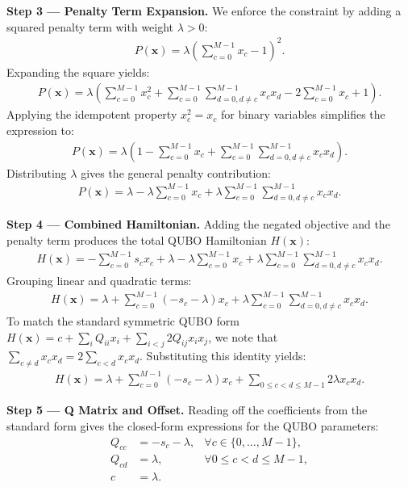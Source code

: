 \documentclass[12pt]{article}
\begin{document}
\textbf{Step 3 --- Penalty Term Expansion.} We enforce the constraint by adding a squared penalty term with weight $\lambda > 0$:
\begin{align}
P(\mathbf{x}) = \lambda \left( \sum_{c=0}^{M-1} x_c - 1 \right)^2.
\end{align}
Expanding the square yields:
\begin{align}
P(\mathbf{x}) = \lambda \left( \sum_{c=0}^{M-1} x_c^2 + \sum_{c=0}^{M-1} \sum_{d=0, d \neq c}^{M-1} x_c x_d - 2 \sum_{c=0}^{M-1} x_c + 1 \right).
\end{align}
Applying the idempotent property $x_c^2 = x_c$ for binary variables simplifies the expression to:
\begin{align}
P(\mathbf{x}) = \lambda \left( 1 - \sum_{c=0}^{M-1} x_c + \sum_{c=0}^{M-1} \sum_{d=0, d \neq c}^{M-1} x_c x_d \right).
\end{align}
Distributing $\lambda$ gives the general penalty contribution:
\begin{align}
P(\mathbf{x}) = \lambda - \lambda \sum_{c=0}^{M-1} x_c + \lambda \sum_{c=0}^{M-1} \sum_{d=0, d \neq c}^{M-1} x_c x_d.
\end{align}

\textbf{Step 4 --- Combined Hamiltonian.} Adding the negated objective and the penalty term produces the total QUBO Hamiltonian $H(\mathbf{x})$:
\begin{align}
H(\mathbf{x}) = -\sum_{c=0}^{M-1} s_c x_c + \lambda - \lambda \sum_{c=0}^{M-1} x_c + \lambda \sum_{c=0}^{M-1} \sum_{d=0, d \neq c}^{M-1} x_c x_d.
\end{align}
Grouping linear and quadratic terms:
\begin{align}
H(\mathbf{x}) = \lambda + \sum_{c=0}^{M-1} (-s_c - \lambda) x_c + \lambda \sum_{c=0}^{M-1} \sum_{d=0, d \neq c}^{M-1} x_c x_d.
\end{align}
To match the standard symmetric QUBO form $H(\mathbf{x}) = c + \sum_{i} Q_{ii} x_i + \sum_{i < j} 2 Q_{ij} x_i x_j$, we note that $\sum_{c \neq d} x_c x_d = 2 \sum_{c < d} x_c x_d$. Substituting this identity yields:
\begin{align}
H(\mathbf{x}) = \lambda + \sum_{c=0}^{M-1} (-s_c - \lambda) x_c + \sum_{0 \leq c < d \leq M-1} 2\lambda x_c x_d.
\end{align}

\textbf{Step 5 --- Q Matrix and Offset.} Reading off the coefficients from the standard form gives the closed-form expressions for the QUBO parameters:
\begin{align}
Q_{cc} &= -s_c - \lambda, & \forall c \in \{0, \dots, M-1\}, \\
Q_{cd} &= \lambda, & \forall 0 \leq c < d \leq M-1, \\
c &= \lambda.
\end{align}
\end{document}
